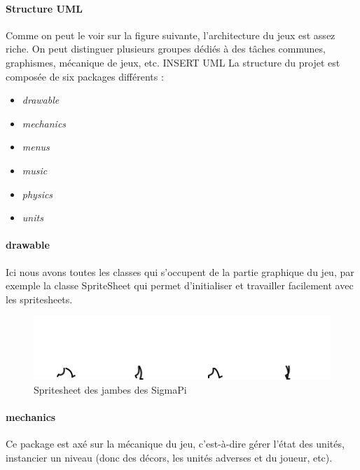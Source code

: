 \documentclass[a4paper,10pt]{article}
\begin{document}
  \paragraph*{Structure UML}
  Comme on peut le voir sur la figure suivante, l'architecture du jeux est assez riche. On peut distinguer plusieurs groupes dédiés à des tâches communes, graphismes, mécanique de jeux, etc. INSERT UML
  \newline La structure du projet est composée de six packages différents :\begin{itemize}
  \item {\itshape drawable}
  \item {\itshape mechanics}
  \item {\itshape menus}
  \item {\itshape music}
  \item {\itshape physics}
  \item {\itshape units}
  \end{itemize}
  \paragraph{drawable}
  Ici nous avons toutes les classes qui s'occupent de la partie graphique du jeu, par exemple la classe SpriteSheet qui permet d'initialiser et travailler facilement avec les spritesheets.
 \begin{figure}[!h]
 \centering
 \vspace{-45pt}
 \includegraphics[scale=0.3]{images/legs}
 \caption{Spritesheet des jambes des SigmaPi}
 \end{figure}
  \paragraph{mechanics}
  Ce package est axé sur la mécanique du jeu, c'est-à-dire gérer l'état des unités, instancier un niveau (donc des décors, les unités adverses et du joueur, etc).
\end{document}
